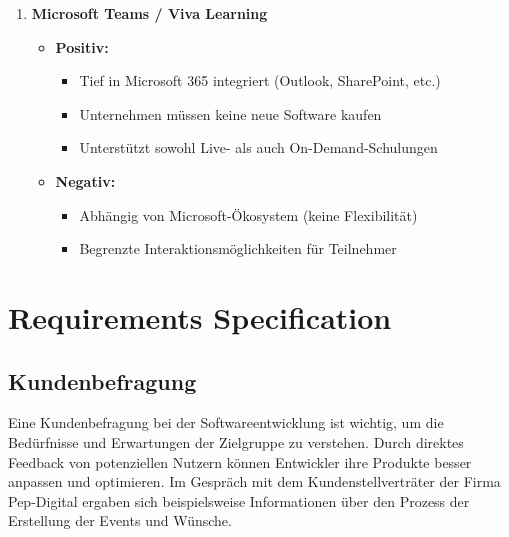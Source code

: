 \documentclass[a4paper,12pt]{article}
\begin{document}
\begin{enumerate}
  \item \textbf{Microsoft Teams / Viva Learning}
  \begin{itemize}
      \item \textbf{Positiv:}
      \begin{itemize}
          \item Tief in Microsoft 365 integriert (Outlook, SharePoint, etc.)
          \item Unternehmen müssen keine neue Software kaufen
          \item Unterstützt sowohl Live- als auch On-Demand-Schulungen
      \end{itemize}
      \item \textbf{Negativ:}
      \begin{itemize}
          \item Abhängig von Microsoft-Ökosystem (keine Flexibilität)
          \item Begrenzte Interaktionsmöglichkeiten für Teilnehmer
      \end{itemize}
  \end{itemize}
\end{enumerate}

\newpage
\section{Requirements Specification}
\subsection{Kundenbefragung}
Eine Kundenbefragung bei der Softwareentwicklung ist wichtig, um die Bedürfnisse und Erwartungen der Zielgruppe zu verstehen. Durch direktes Feedback von potenziellen Nutzern können Entwickler ihre Produkte besser anpassen und optimieren. Im Gespräch mit dem Kundenstellverträter der Firma Pep-Digital ergaben sich beispielsweise Informationen über den Prozess der Erstellung der Events und Wünsche.
\end{document}
